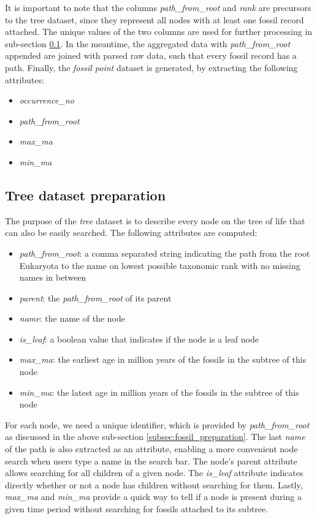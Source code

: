 \documentclass[11pt, a4paper,oneside,chapterprefix=false]{scrbook}
\begin{document}
It is important to note that the columns \emph{path\_from\_root} and \emph{rank} are precursors to the tree dataset, since they represent all nodes with at least one fossil record attached. The unique values of the two columns are used for further processing in sub-section \ref{subsec:tree_preparation}. In the meantime, the aggregated data with \emph{path\_from\_root} appended are joined with parsed raw data, such that every fossil record has a path. Finally, the \emph{fossil point} dataset is generated, by extracting the following attributes: 

\begin{itemize}
	\item \textit{occurrence\_no}
	\item \textit{path\_from\_root}
	\item \textit{max\_ma}
	\item \textit{min\_ma}
\end{itemize}


\subsection{Tree dataset preparation} \label{subsec:tree_preparation}
The purpose of the \emph{tree} dataset is to describe every node on the tree of life that can also be easily searched. The following attributes are computed: \\

\begin{itemize}
	\item \textit{path\_from\_root}: a comma separated string indicating the path from the root Eukaryota to the name on lowest possible taxonomic rank with no missing names in between
	\item \textit{parent}: the \textit{path\_from\_root} of its parent
	\item \textit{name}: the name of the node
	\item \textit{is\_leaf}: a boolean value that indicates if the node is a leaf node
	\item \textit{max\_ma}: the earliest age in million years of the fossils in the subtree of this node
	\item \textit{min\_ma}: the latest age in million years of the fossils in the subtree of this node
\end{itemize}

For each node, we need a unique identifier, which is provided by \emph{path\_from\_root} as discussed in the above sub-section \ref{subsec:fossil_preparation}. The last \emph{name} of the path is also extracted as an attribute, enabling a more convenient node search when users type a name in the search bar. The node's parent attribute allows searching for all children of a given node. The \emph{is\_leaf} attribute indicates directly whether or not a node has children without searching for them. Lastly, \emph{max\_ma} and \emph{min\_ma} provide a quick way to tell if a node is present during a given time period without searching for fossils attached to its subtree. \\
\end{document}
